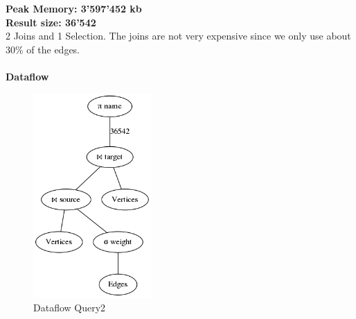 \documentclass[11pt,singlecolumn]{scrartcl}
\begin{document}
\textbf{Peak Memory: 3'597'452 kb}\\
\textbf{Result size: 36'542}\\
2 Joins and 1 Selection. The joins are not very expensive since we only use about 30\% of the edges.\\\\
\textbf{Dataflow}
\begin{figure}[H]
\includegraphics[width=0.4\textwidth]{graph2}
\caption{Dataflow Query2}
\end{figure}
\clearpage
\end{document}
